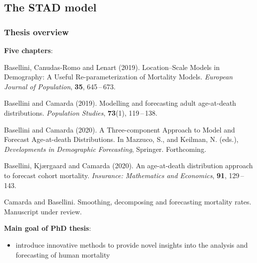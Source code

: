 \documentclass[12pt, xcolor=table]{beamer}  %
\begin{document}
\subsection{The STAD model}
\begin{frame}[plain]\frametitle{Thesis overview}
	\textbf{Five chapters}: 
	\begin{itemize}
		\scriptsize	
		\item { Basellini, Canudas-Romo and Lenart (2019). Location--Scale Models in Demography: A Useful Re-parameterization of Mortality Models. {\it European Journal of Population}, {\bf 35}, 645\,--\,673. }	
		
		\item  { Basellini and Camarda (2019). Modelling and forecasting adult age-at-death distributions. {\it Population Studies}, {\bf 73}(1), 119\,--\,138. }
			
		\item { Basellini and Camarda (2020). A Three-component Approach to Model and Forecast Age-at-death Distributions. In Mazzuco, S., and Keilman, N. (eds.), {\it Developments in Demographic Forecasting}, Springer. Forthcoming.
			
		\item Basellini, Kj{\ae}rgaard and Camarda (2020). An age-at-death distribution approach \\ to forecast cohort mortality. {\it Insurance: Mathematics and Economics}, {\bf 91}, 129\,--\,143.	
			
		\item Camarda and Basellini. Smoothing, decomposing and forecasting mortality rates. Manuscript under review. }	
	\end{itemize}
	\bigskip
	{\pgfsetfillopacity{1} 
		\textbf{Main goal of PhD thesis}: 
		\begin{itemize}
			\item introduce innovative methods to provide novel insights into the analysis and forecasting of human mortality	
		\end{itemize}
	}
\end{frame}
\end{document}

